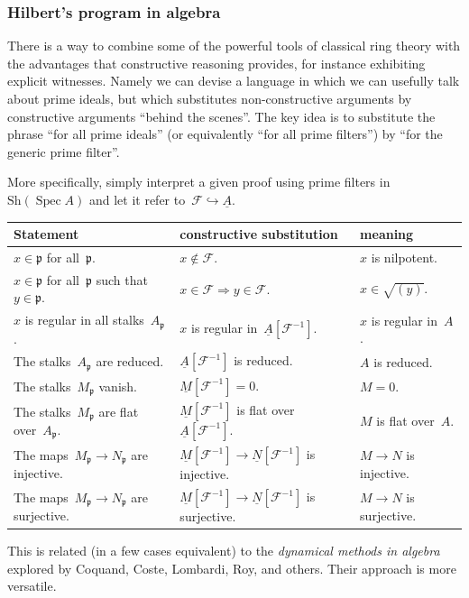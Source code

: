 \documentclass[12pt,utf8,notheorems,compress,t]{beamer}
\newcommand{\F}{\mathcal{F}}
\newcommand{\ppp}{\mathfrak{p}}
\newcommand{\Sh}{\mathrm{Sh}}
\DeclareMathOperator{\Spec}{Spec}
\renewcommand{\_}{\mathpunct{.}}
\newcommand{\?}{\,{:}\,}
\newcommand{\ull}[1]{\underline{#1}}
\begin{document}
\begin{frame}\frametitle{Hilbert's program in algebra}
  \scriptsize\justifying
  There is a way to combine some of the powerful tools of classical ring theory
  with the advantages that constructive reasoning provides, for instance
  exhibiting explicit witnesses. Namely we can devise
  a language in which we can usefully talk about prime ideals, but which
  substitutes non-constructive arguments by constructive arguments ``behind
  the scenes''. The key idea is to substitute the phrase ``for all prime ideals''
  (or equivalently ``for all prime filters'') by ``for the generic prime filter''.

  More specifically, simply interpret a given proof using prime filters
  in~$\Sh(\Spec A)$ and let it refer to~$\F \hookrightarrow \underline{A}$.

  \hspace*{-0.75cm}%
  \begin{tabular}{lll}
    \toprule
    Statement & constructive substitution & meaning \\\midrule
    $x \in \ppp$ for all~$\ppp$. &
    $x \not\in \F$. &
    $x$ is nilpotent. \\
    $x \in \ppp$ for all~$\ppp$ such that~$y \in \ppp$. &
    $x \in \F \Rightarrow y \in \F$. &
    $x \in \sqrt{(y)}$. \\
    $x$ is regular in all stalks~$A_\ppp$. &
    $x$ is regular in~$\ull{A}[\F^{-1}]$. &
    $x$ is regular in~$A$. \\
    The stalks~$A_\ppp$ are reduced. &
    $\ull{A}[\F^{-1}]$ is reduced. &
    $A$ is reduced. \\
    The stalks~$M_\ppp$ vanish. &
    $\ull{M}[\F^{-1}] = 0$. &
    $M = 0$. \\
    The stalks~$M_\ppp$ are flat over~$A_\ppp$. &
    $\ull{M}[\F^{-1}]$ is flat over~$\ull{A}[\F^{-1}]$. &
    $M$ is flat over~$A$. \\
    The maps~$M_\ppp \to N_\ppp$ are injective. &
    $\ull{M}[\F^{-1}] \to \ull{N}[\F^{-1}]$ is injective. &
    $M \to N$ is injective. \\
    The maps~$M_\ppp \to N_\ppp$ are surjective. &
    $\ull{M}[\F^{-1}] \to \ull{N}[\F^{-1}]$ is surjective. &
    $M \to N$ is surjective. \\
    \bottomrule
  \end{tabular}

  This is related (in a few cases equivalent) to the \emph{dynamical methods in
  algebra} explored by Coquand, Coste, Lombardi, Roy, and others. Their
  approach is more versatile.
  \par
\end{frame}
\end{document}
